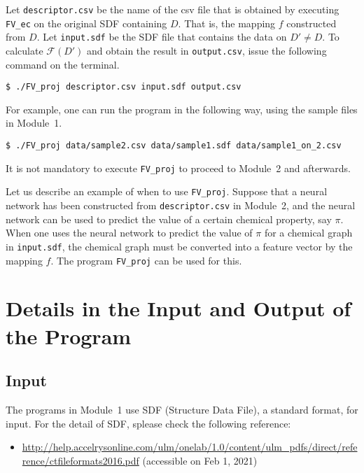\documentclass[11pt, titlepage, dvipdfmx, twoside]{article}
\begin{document}
Let {\tt descriptor.csv}
be the name of the csv file that is obtained by
executing {\tt FV\_ec} on the original SDF containing $D$.
That is, the mapping $f$ constructed from $D$.
Let {\tt input.sdf} be the SDF file
that contains the data on $D'\ne D$.
To calculate ${\mathcal F}(D')$ and
obtain the result in {\tt output.csv},
issue the following command on the terminal. 
\begin{oframed}
{\small
\verb|$ ./FV_proj descriptor.csv input.sdf output.csv|
}
\end{oframed}

For example, one can run the program in the following way,
using the sample files in Module~1.  
\begin{oframed}
{\small
\verb|$ ./FV_proj data/sample2.csv data/sample1.sdf data/sample1_on_2.csv|
}
\end{oframed}

It is not mandatory to execute {\tt FV\_proj} to proceed to Module~2 and afterwards.

Let us describe an example of when to use {\tt FV\_proj}.
Suppose that a neural network has been constructed from
{\tt descriptor.csv} in Module~2,
and the neural network can be used to predict
the value of a certain chemical property, say $\pi$.
When one uses the neural network to predict
the value of $\pi$ for a chemical graph in {\tt input.sdf},
the chemical graph must be converted into
a feature vector by the mapping $f$.
The program {\tt FV\_proj} can be used for this. 


\clearpage
\section{Details in the Input and Output of the Program}
\label{sec:io}


\subsection{Input}

The programs in Module~1
use SDF (Structure Data File),
a standard format, for input.
For the detail of SDF, splease check the following reference: 
\begin{itemize}
\item \url{http://help.accelrysonline.com/ulm/onelab/1.0/content/ulm_pdfs/direct/reference/ctfileformats2016.pdf} (accessible on Feb 1, 2021)
\end{itemize}
\end{document}
